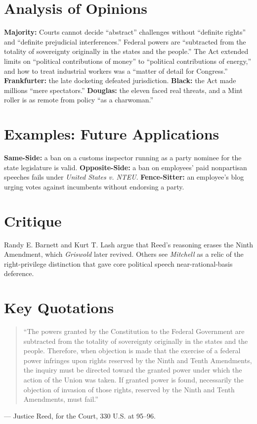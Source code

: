 \documentclass[12pt]{article}
\begin{document}
\section{Analysis of Opinions}
\textbf{Majority:} Courts cannot decide ``abstract'' challenges without ``definite rights'' and ``definite prejudicial interferences.'' Federal powers are ``subtracted from the totality of sovereignty originally in the states and the people.'' The Act extended limits on ``political contributions of money'' to ``political contributions of energy,'' and how to treat industrial workers was a ``matter of detail for Congress.'' \textbf{Frankfurter:} the late docketing defeated jurisdiction. \textbf{Black:} the Act made millions ``mere spectators.'' \textbf{Douglas:} the eleven faced real threats, and a Mint roller is as remote from policy ``as a charwoman.''

\section{Examples: Future Applications}
\textbf{Same-Side:} a ban on a customs inspector running as a party nominee for the state legislature is valid. \textbf{Opposite-Side:} a ban on employees' paid nonpartisan speeches fails under \textit{United States v. NTEU}. \textbf{Fence-Sitter:} an employee's blog urging votes against incumbents without endorsing a party.

\section{Critique}
Randy E. Barnett and Kurt T. Lash argue that Reed's reasoning erases the Ninth Amendment, which \textit{Griswold} later revived. Others see \textit{Mitchell} as a relic of the right-privilege distinction that gave core political speech near-rational-basis deference.

\section{Key Quotations}
\begin{quote}
``The powers granted by the Constitution to the Federal Government are subtracted from the totality of sovereignty originally in the states and the people. Therefore, when objection is made that the exercise of a federal power infringes upon rights reserved by the Ninth and Tenth Amendments, the inquiry must be directed toward the granted power under which the action of the Union was taken. If granted power is found, necessarily the objection of invasion of those rights, reserved by the Ninth and Tenth Amendments, must fail.''
\end{quote}
\noindent --- Justice Reed, for the Court, 330 U.S. at 95--96.
\end{document}
